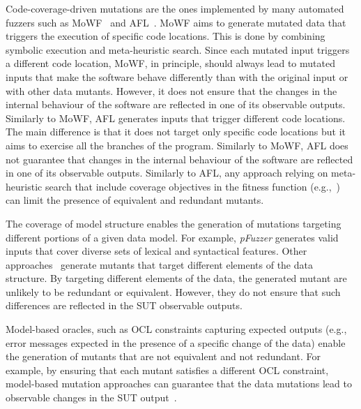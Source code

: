 Code-coverage-driven mutations are the ones implemented by many automated fuzzers such as 
MoWF~\cite{pham2016model} and AFL~\cite{gutmann2016fuzzing}.
MoWF aims to generate mutated data that triggers the execution of specific code locations. This is done by combining symbolic execution and meta-heuristic search.
Since each mutated input triggers a different code location, MoWF, in principle, should always lead to mutated inputs that make the software behave differently than with the original input or with other data mutants. However, it does not ensure that the changes in the internal behaviour of the software are reflected in one of its observable outputs.
Similarly to MoWF, AFL generates inputs that trigger different code locations. The main difference is that it does not target only specific code locations but it aims to exercise all the branches of the program. 
Similarly to MoWF, AFL does not guarantee that changes in the internal behaviour of the software are reflected in one of its observable outputs.
Similarly to AFL, any approach relying on meta-heuristic search that include coverage objectives in the fitness function (e.g.,~\cite{di2015evolutionary}) can limit the presence of equivalent and redundant mutants.


The coverage of model structure enables the generation of mutations targeting different portions of a given data model.
For example, \emph{pFuzzer} generates valid inputs that cover diverse sets of lexical and syntactical features.
Other approaches~\cite{di2015generating} generate mutants that target different elements of the data structure.
By targeting different elements of the data, the generated mutant are unlikely to be redundant or equivalent. However, they do not ensure that such differences are reflected in the SUT observable outputs.


Model-based oracles, such as OCL constraints capturing expected outputs (e.g., error messages expected in the presence of a specific change of the data) enable the generation of mutants that are not equivalent and not redundant. For example, by ensuring that each mutant satisfies a different OCL constraint, model-based mutation approaches can guarantee that the data mutations lead to observable changes in the SUT output~\cite{di2015generating}.


